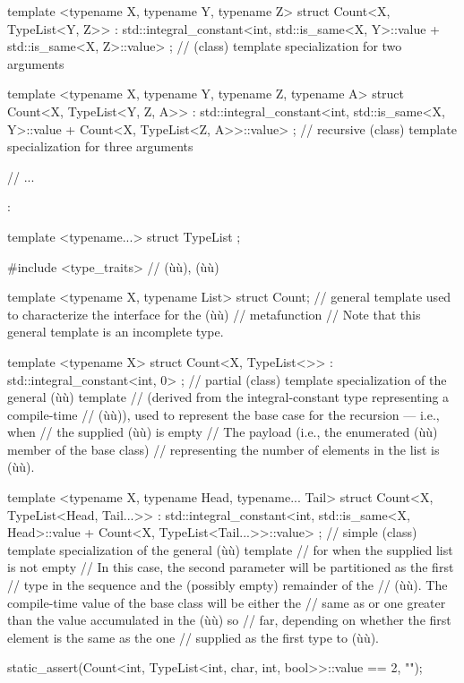 {{\begin{emcppslisting}[emcppsbatch=e3,style=footcode]
template <typename X, typename Y, typename Z>
struct Count<X, TypeList<Y, Z>>
    : std::integral_constant<int,
        std::is_same<X, Y>::value + std::is_same<X, Z>::value> { };
    // (class) template specialization for two arguments

template <typename X, typename Y, typename Z, typename A>
struct Count<X, TypeList<Y, Z, A>>
    : std::integral_constant<int,
        std::is_same<X, Y>::value + Count<X, TypeList<Z, A>>::value> { };
    // recursive (class) template specialization for three arguments

// ...
\end{emcppslisting}
      }}:

\begin{emcppshiddenlisting}[emcppsbatch=e4]
template <typename...> struct TypeList { };
\end{emcppshiddenlisting}
\begin{emcppslisting}[emcppsbatch=e4,label={relaxedconstexpr-countcode}]
#include <type_traits>  // (ù{}ù), (ù{}ù)

template <typename X, typename List> struct Count;
    // general template used to characterize the interface for the (ù{}ù)
    // metafunction
    // Note that this general template is an incomplete type.

template <typename X>
struct Count<X, TypeList<>> : std::integral_constant<int, 0> { };
    // partial (class) template specialization of the general (ù{}ù) template
    // (derived from the integral-constant type representing a compile-time
    // (ù{}ù)), used to represent the base case for the recursion --- i.e., when
    // the supplied (ù{}ù) is empty
    // The payload (i.e., the enumerated (ù{}ù) member of the base class)
    // representing the number of elements in the list is (ù{}ù).

template <typename X, typename Head, typename... Tail>
struct Count<X, TypeList<Head, Tail...>>
    : std::integral_constant<int,
        std::is_same<X, Head>::value + Count<X, TypeList<Tail...>>::value> { };
    // simple (class) template specialization of the general (ù{}ù) template
    // for when the supplied list is not empty
    // In this case, the second parameter will be partitioned as the first
    // type in the sequence and the (possibly empty) remainder of the
    // (ù{}ù). The compile-time value of the base class will be either the
    // same as or one greater than the value accumulated in the (ù{}ù) so
    // far, depending on whether the first element is the same as the one
    // supplied as the first type to (ù{}ù).

static_assert(Count<int, TypeList<int, char, int, bool>>::value == 2, "");
\end{emcppslisting}


